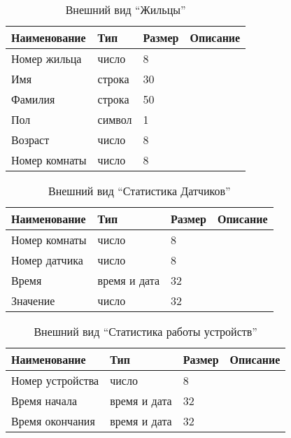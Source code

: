           \begin{table}[h!]
            \centering
            \caption{Внешний вид “Жильцы”}
            \label{sensor:size}
            \begin{tabular}{|l|l|l|l|}
            \hline
            Наименование & Тип & Размер & Описание \\ \hline
            Номер жильца & число & 8 & \\ \hline
            Имя & строка & 30 & \\ \hline
            Фамилия & строка & 50 & \\ \hline
            Пол & символ & 1 & \\ \hline
            Возраст & число & 8 & \\ \hline
            Номер комнаты & число & 8 & \\ \hline
            \end{tabular}
          \end{table}
          \begin{table}[h!]
            \centering
            \caption{Внешний вид “Статистика Датчиков”}
            \label{room:size}
            \begin{tabular}{|l|l|l|l|}
            \hline
            Наименование & Тип & Размер & Описание \\ \hline
            Номер комнаты & число & 8 & \\ \hline
            Номер датчика & число & 8 & \\ \hline
            Время & время и дата & 32 & \\ \hline
            Значение & число & 32 & \\ \hline
            \end{tabular}
          \end{table}
          \begin{table}[h!]
            \centering
            \caption{Внешний вид “Статистика работы устройств”}
            \label{room:size}
            \begin{tabular}{|l|l|l|l|}
            \hline
            Наименование & Тип & Размер & Описание \\ \hline
            Номер устройства & число & 8 & \\ \hline
            Время начала & время и дата & 32 &          \\ \hline
            Время окончания & время и дата & 32 &          \\ \hline
            \end{tabular}
          \end{table}
